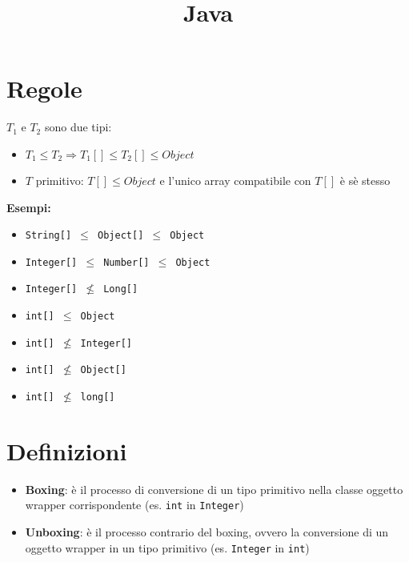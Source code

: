 \documentclass[10pt]{article}
\title{Java}
\author{}
\date{}
\begin{document}
\maketitle
{}
\section{Regole}
$T_{1} \text{ e } T_{2}$ sono due tipi:
\begin{itemize}
    \item $T_{1}\leq T_{2}\Rightarrow T_{1}[]\leq T_{2}[] \leq Object$
    \item $T$ primitivo: $T[]\leq Object$ e l'unico array compatibile con $T[]$ è sè stesso
\end{itemize}
\textbf{Esempi:}
\begin{itemize}
    \item \texttt{String[] $\leq$ Object[] $\leq$ Object}
    \item \texttt{Integer[] $\leq$ Number[] $\leq$ Object}
    \item \texttt{Integer[] $\nleq$ Long[]}
    \item \texttt{int[] $\leq$ Object}
    \item \texttt{int[] $\nleq$ Integer[]}
    \item \texttt{int[] $\nleq$ Object[]}
    \item \texttt{int[] $\nleq$ long[]}
\end{itemize}
\section{Definizioni}
\begin{itemize}
    \item \textbf{Boxing}: è il processo di conversione di un tipo primitivo nella classe oggetto wrapper corrispondente (es. \texttt{int} in \texttt{Integer})
    \item \textbf{Unboxing}: è il processo contrario del boxing, ovvero la conversione di un oggetto wrapper in un tipo primitivo (es. \texttt{Integer} in \texttt{int})
\end{itemize}
\end{document}
